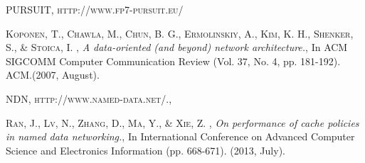 \documentclass[12pt]{ociamthesis}  %
\begin{document}
\begin{thebibliography}{a}
	 \textsc{PURSUIT, http://www.fp7-pursuit.eu/}
	\textit{}
	
	 \textsc{Koponen, T., Chawla, M., Chun, B. G., Ermolinskiy, A., Kim, K. H., Shenker, S., \& Stoica, I. },
	\textit{A data-oriented (and beyond) network architecture.}, In ACM SIGCOMM Computer Communication Review (Vol. 37, No. 4, pp. 181-192). ACM.(2007, August).
	
	 \textsc{NDN, http://www.named-data.net/.},
	\textit{}
	
	 \textsc{Ran, J., Lv, N., Zhang, D., Ma, Y., \& Xie, Z. },
	\textit{On performance of cache policies in named data networking.}, In International Conference on Advanced Computer Science and Electronics Information (pp. 668-671). (2013, July).
\end{thebibliography}
\end{document}
